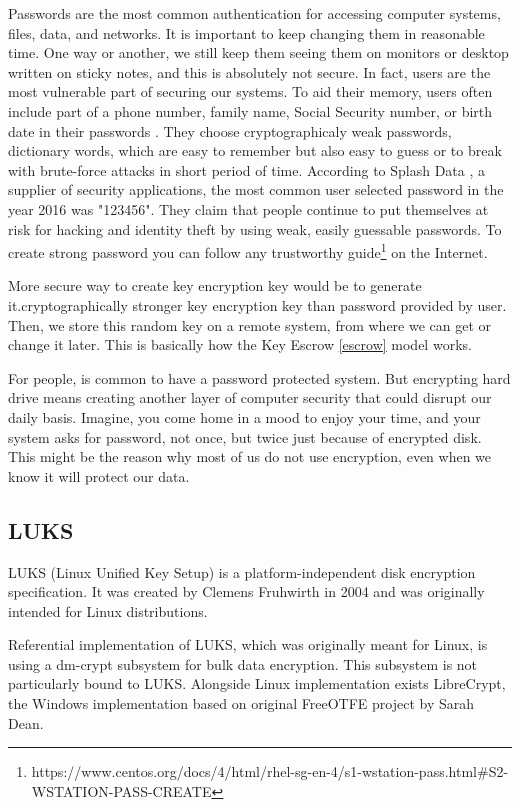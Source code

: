 \documentclass[../xdudla00-porting-Tang-to-Open-WRT.tex]{subfiles}
\begin{document}
Passwords are the most common authentication for accessing computer systems, files, data, and networks. 
It is important to keep changing them in reasonable time. 
One way or another, we still keep them seeing them on monitors or desktop written on sticky notes, and this is absolutely not secure. 
In fact, users are the most vulnerable part of securing our systems.
To aid their memory, users often include part of a phone number, family name, Social Security number, or birth date in their passwords \cite{pwdsec}.
They choose cryptographicaly weak passwords, dictionary words, which are easy to remember but also easy to guess or to break with brute-force attacks in short period of time.
According to Splash Data \cite{splashdata}, a supplier of security applications, the most common user selected password in the year 2016 was "123456". 
They claim that people continue to put themselves at risk for hacking and identity theft by using weak, easily guessable passwords.
To create strong password you can follow any trustworthy guide\footnote{https://www.centos.org/docs/4/html/rhel-sg-en-4/s1-wstation-pass.html\#S2-WSTATION-PASS-CREATE} on the Internet.

More secure way to create key encryption key would be to generate it.cryptographically stronger key encryption key than password provided by user.
Then, we store this random key on a remote system, from where we can get or change it later.
This is basically how the Key Escrow \ref{escrow} model works.

For people, is common to have a password protected system.
But encrypting hard drive means creating another layer of computer security that could disrupt our daily basis.
Imagine, you come home in a mood to enjoy your time, and your system asks for password, not once, but twice just because of encrypted disk.
This might be the reason why most of us do not use encryption, even when we know it will protect our data.

\subsection{LUKS}

LUKS (Linux Unified Key Setup) is a platform-independent disk encryption specification. 
It was created by Clemens Fruhwirth in 2004 and was originally intended for Linux distributions.

Referential implementation of LUKS, which was originally meant for Linux, is using a dm-crypt subsystem for bulk data encryption.
This subsystem is not particularly bound to LUKS.
Alongside Linux implementation exists LibreCrypt, the Windows implementation based on original FreeOTFE \cite{FreeOTFE} project by Sarah Dean.
\end{document}
